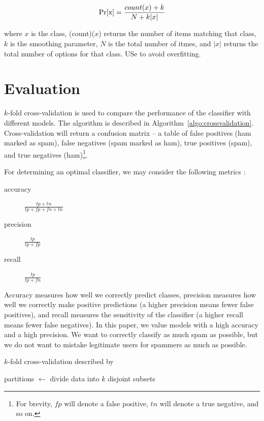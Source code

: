 \documentclass[10pt]{article}
\begin{document}
\[ \Pr[\mathrm{x}] = \frac{{\sc count}(x) + k}{N + k\vert x \vert} \]

where $x$ is the class, {\sc(count)}($x$) returns the number of items matching
that class, $k$ is the smoothing parameter, $N$ is the total number of itmes,
and $\vert x\vert$ returns the total number of options for that class. USe to
avoid overfitting.

\section{Evaluation}
$k$-fold cross-validation is used to compare the performance of the classifier
with different models. The algorithm is described in
Algorithm~\ref{algo:crossvalidation}. Cross-validation will return a confusion
matrix -- a table of false positives (ham marked as spam), false negatives
(spam marked as ham), true positives (spam), and true negatives
(ham)\footnote{For brevity, $fp$ will denote a false positive, $tn$ will
  denote a true negative, and so on.}.

For determining an optimal classifier, we may consider the following metrics \cite{eval}:

\begin{description}
\item[accuracy] $\frac{tp + tn}{tp + fp + fn + tn}$
\item[precision] $\frac{tp}{tp + fp}$
\item[recall] $\frac{tp}{tp + fn}$
\end{description}

Accuracy measures how well we correctly predict classes, precision
measures how well we correctly make positive predictions (a higher precision
means fewer false positives), and recall measures the sensitivity of the
classifier (a higher recall means fewer false negatives). In this paper, we
value models with a high accuracy and a high precision. We want to correctly
classify as much spam as possible, but we do not want to mistake legitimate
users for spammers as much as possible.


\begin{algorithm}
\caption{$k$-fold cross-validation described by \cite[p147]{mitchell}}
\begin{algorithmic}
\State partitions $\gets$ divide data into $k$ disjoint subsets
\State {}
\EndFor
\EndFunction
\end{algorithmic}\label{algo:crossvalidation}
\end{algorithm}
\end{document}
